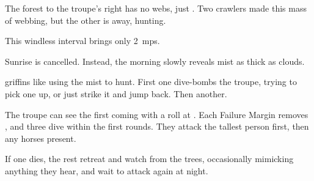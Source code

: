 The forest to the troupe's right has no webs, just .
Two \glspl{crawler} made this mass of webbing, but the other is away, hunting.

This windless \gls{interval} brings only 2~\glspl{mp}.

\else%

\begin{boxtext}
  Sunrise is cancelled.
  Instead, the morning slowly reveals mist as thick as clouds.
\end{boxtext}

\Glspl{griffin} like using the mist to hunt.
First one dive-bombs the troupe, trying to pick one up, or just strike it and jump back.
Then another.

\griffin

The troupe can see the first coming with a  roll at \tn[12].
Each Failure Margin removes , and three dive within the first \glspl{round}.
They attack the tallest person first, then any horses present.

If one dies, the rest retreat and watch from the trees, occasionally mimicking anything they hear, and wait to attack again at night.

\fi
